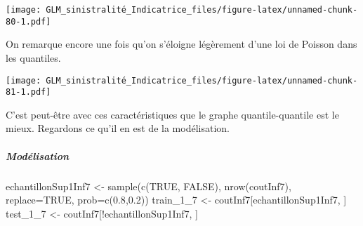 \documentclass[
]{article}
\newenvironment{Shaded}{\begin{snugshade}}{\end{snugshade}}
\newcommand{\AttributeTok}[1]{\textcolor[rgb]{0.77,0.63,0.00}{#1}}
\newcommand{\ConstantTok}[1]{\textcolor[rgb]{0.00,0.00,0.00}{#1}}
\newcommand{\DecValTok}[1]{\textcolor[rgb]{0.00,0.00,0.81}{#1}}
\newcommand{\FloatTok}[1]{\textcolor[rgb]{0.00,0.00,0.81}{#1}}
\newcommand{\FunctionTok}[1]{\textcolor[rgb]{0.00,0.00,0.00}{#1}}
\newcommand{\NormalTok}[1]{#1}
\newcommand{\OtherTok}[1]{\textcolor[rgb]{0.56,0.35,0.01}{#1}}
\newcommand{\SpecialCharTok}[1]{\textcolor[rgb]{0.00,0.00,0.00}{#1}}
\newcommand{\StringTok}[1]{\textcolor[rgb]{0.31,0.60,0.02}{#1}}
\begin{document}
\texttt{[image: GLM\_sinistralité\_Indicatrice\_files/figure-latex/unnamed-chunk-80-1.pdf]}

On remarque encore une fois qu'on s'éloigne légèrement d'une loi de
Poisson dans les quantiles.

\begin{Shaded}
\end{Shaded}

\texttt{[image: GLM\_sinistralité\_Indicatrice\_files/figure-latex/unnamed-chunk-81-1.pdf]}

C'est peut-être avec ces caractéristiques que le graphe
quantile-quantile est le mieux. Regardons ce qu'il en est de la
modélisation.

\hypertarget{moduxe9lisation}{%
\subparagraph{Modélisation}\label{moduxe9lisation}}

\begin{Shaded}
\begin{Highlighting}[]
\NormalTok{echantillonSup1Inf7 }\OtherTok{\textless{}{-}} \FunctionTok{sample}\NormalTok{(}\FunctionTok{c}\NormalTok{(}\ConstantTok{TRUE}\NormalTok{, }\ConstantTok{FALSE}\NormalTok{), }\FunctionTok{nrow}\NormalTok{(coutInf7), }\AttributeTok{replace=}\ConstantTok{TRUE}\NormalTok{, }\AttributeTok{prob=}\FunctionTok{c}\NormalTok{(}\FloatTok{0.8}\NormalTok{,}\FloatTok{0.2}\NormalTok{))}
\NormalTok{train\_1\_7  }\OtherTok{\textless{}{-}}\NormalTok{ coutInf7[echantillonSup1Inf7, ]}
\NormalTok{test\_1\_7   }\OtherTok{\textless{}{-}}\NormalTok{ coutInf7[}\SpecialCharTok{!}\NormalTok{echantillonSup1Inf7, ]}
\end{Highlighting}
\end{Shaded}
\end{document}
